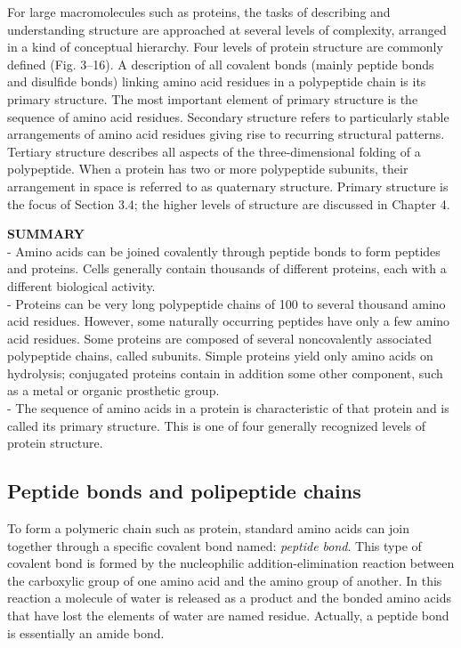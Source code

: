 For large macromolecules such as proteins, the tasks of describing and understanding structure are approached at several levels of complexity, arranged in a kind of conceptual hierarchy. Four levels of protein structure are commonly defined (Fig. 3–16). A description of all covalent bonds (mainly peptide bonds and disulfide bonds) linking amino acid residues in a polypeptide chain is its primary structure. The most important element of primary structure is the sequence of amino acid residues. Secondary structure refers to particularly stable arrangements of amino acid residues giving rise to recurring structural patterns. Tertiary structure describes all aspects of the three-dimensional folding of a polypeptide. When a protein has two or more polypeptide subunits, their arrangement in space is referred to as quaternary structure. Primary structure is the focus of Section 3.4; the higher levels of structure are discussed in Chapter 4.

\textbf{SUMMARY}\\
- Amino acids can be joined covalently through peptide bonds to form peptides and proteins. Cells generally contain thousands of different proteins, each with a different biological activity.\\
- Proteins can be very long polypeptide chains of 100 to several thousand amino acid residues. However, some naturally occurring peptides have only a few amino acid residues. Some proteins are composed of several noncovalently associated polypeptide chains, called subunits. Simple proteins yield only amino acids on hydrolysis; conjugated proteins contain in addition some other component, such as a metal or organic prosthetic group.\\
- The sequence of amino acids in a protein is characteristic of that protein and is called its primary structure. This is one of four generally recognized levels of protein structure.
\cite{nelson2008lehninger}


\subsection{Peptide bonds and polipeptide chains}\label{ssec:peptitde}
To form a polymeric chain such as protein, standard amino acids can join together through a specific covalent bond named: \textit{peptide bond}. This type of covalent bond is formed by the nucleophilic addition-elimination reaction between the carboxylic group of one amino acid and the amino group of another. In this reaction a molecule of water is released as a product and the  bonded amino acids that have lost the elements of water are named residue. Actually, a peptide bond is essentially an amide bond.

